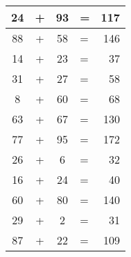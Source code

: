\documentclass[15pt]{scrartcl}
\begin{document}
\huge
\begin{longtable}{cccp{8cm}r}
24 &+& 93 &=& 117 \\ \hline
88 &+& 58 &=& 146 \\ \hline
14 &+& 23 &=& 37 \\ \hline
31 &+& 27 &=& 58 \\ \hline
8 &+& 60 &=& 68 \\ \hline
63 &+& 67 &=& 130 \\ \hline
77 &+& 95 &=& 172 \\ \hline
26 &+& 6 &=& 32 \\ \hline
16 &+& 24 &=& 40 \\ \hline
60 &+& 80 &=& 140 \\ \hline
29 &+& 2 &=& 31 \\ \hline
87 &+& 22 &=& 109 \\ \hline
\end{longtable}
\end{document}
